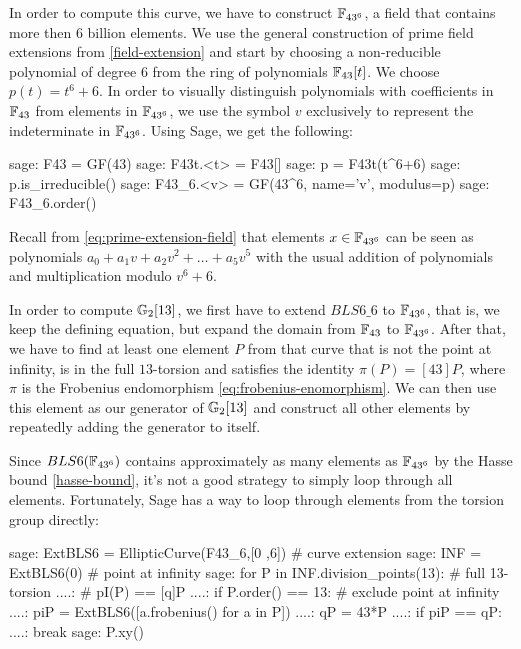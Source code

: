 In order to compute this curve, we have to construct $\mathbb{F}_{43^6}$, a field that contains more then 6 billion elements. We use the general construction of prime field extensions from \ref{field-extension} and start by choosing a non-reducible polynomial of degree $6$ from the ring of polynomials $\mathbb{F}_{43}[t]$. We choose $p(t) = t^6+6$. In order to visually distinguish polynomials with coefficients in $\mathbb{F}_{43}$ from elements in $\mathbb{F}_{43^6}$, we use the symbol $v$ exclusively to represent the indeterminate in $\mathbb{F}_{43^6}$. Using Sage, we get the following:
\begin{sagecommandline}
sage: F43 = GF(43)
sage: F43t.<t> = F43[]
sage: p = F43t(t^6+6)
sage: p.is_irreducible()
sage: F43_6.<v> = GF(43^6, name='v', modulus=p)
sage: F43_6.order()
\end{sagecommandline}

Recall from \ref{eq:prime-extension-field} that elements $x\in\mathbb{F}_{43^6}$ can be seen as polynomials $a_0+a_1v + a_2v^2+\ldots + a_5 v^5$ with the usual addition of polynomials and multiplication modulo $v^6+6$. 

In order to compute $\mathbb{G}_2[13]$, we first have to extend $BLS6\_6$ to $\mathbb{F}_{43^6}$, that is, we keep the defining equation, but expand the domain from $\mathbb{F}_{43}$ to $\mathbb{F}_{43^6}$. After that, we have to find at least one element $P$ from that curve that is not the point at infinity, is in the full $13$-torsion and  satisfies the identity $\pi(P) = [43]P$, where $\pi$ is the Frobenius endomorphism \ref{eq:frobenius-enomorphism}. We can then use this element as our generator of $\mathbb{G}_2[13]$ and construct all other elements by repeatedly adding the generator to itself.

Since $BLS6(\mathbb{F}_{43^6})$ contains approximately as many elements as $\mathbb{F}_{43^6}$ by the Hasse bound \ref{hasse-bound}, it's not a good strategy to simply loop through all elements. Fortunately, Sage has a way to loop through elements from the torsion group directly:

\begin{sagecommandline}
sage: ExtBLS6 = EllipticCurve(F43_6,[0 ,6]) # curve extension
sage: INF = ExtBLS6(0) # point at infinity
sage: for P in INF.division_points(13): # full 13-torsion
....:     # pI(P) == [q]P
....:     if P.order() == 13: # exclude point at infinity
....:         piP = ExtBLS6([a.frobenius() for a in P])
....:         qP = 43*P
....:         if piP == qP:
....:             break
sage: P.xy()
\end{sagecommandline}

